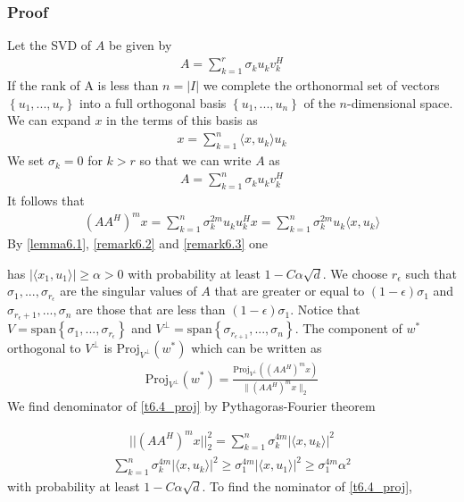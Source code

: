 \documentclass[a4paper, english, headtopline=0.08em, headsepline=0.04em, left = 1cm, right = 1cm, DIV=15]{article}
\begin{document}
\subsubsection*{Proof}
Let the SVD of $A$ be given by
\begin{align*}
	A = \sum_{k=1}^r \sigma_k u_k v_k^H
\end{align*}
If the rank of A is less than $n=|I|$ we complete the orthonormal set of vectors $\left\{u_1,...,u_r\right\}$
into a full orthogonal basis $\left\{u_1,...,u_n\right\}$ of the $n$-dimensional space.
We can expand $x$ in the terms of this basis as
\begin{align*}
	x = \sum_{k=1}^n \langle x,u_k\rangle u_k
\end{align*}
We set $\sigma_k=0$ for $k>r$ so that we can write $A$ as
\begin{align*}
	A = \sum_{k=1}^n \sigma_k u_k v_k^H
\end{align*}
It follows that 
\begin{align*}
	(AA^H)^m x = \sum_{k=1}^n \sigma_k^{2m}u_ku_k^Hx = \sum_{k=1}^n \sigma_k^{2m}u_k\langle x,u_k\rangle
\end{align*}
By \cref{lemma6.1}, \cref{remark6.2} and \cref{remark6.3} one 



has $|\langle x_1,u_1 \rangle| \geq  \alpha > 0$ with probability 
at least $1-C\alpha \sqrt{d}$.
We choose $r_{\epsilon}$ such that $\sigma_1,...,\sigma_{r_\epsilon}$ are the singular values of
$A$ that are greater or equal to $(1-\epsilon)\sigma_1$ and $\sigma_{r_{\epsilon}+1},...,\sigma_n$ are those 
that are less than $(1-\epsilon)\sigma_1$. Notice that $V = \text{span}\left\{\sigma_1,...,\sigma_{r_\epsilon}\right\}$ and
$V^\bot = \text{span}\left\{\sigma_{r_{\epsilon+1}},...,\sigma_{n}\right\}$.
The component of $w^*$ orthogonal to $V^\bot$ is $\text{Proj}_{V^{\bot }}(w^*)$ which can be written as
\begin{align}\label{t6.4_proj}
	\text{Proj}_{V^{\bot }}(w^*) = \frac{\text{Proj}_{V^{\bot}}\left( \left( AA^H\right)^m x \right)}{\|\left(AA^H\right)^m x\|_2}
\end{align}
We find  denominator of \cref{t6.4_proj} by Pythagoras-Fourier theorem

\begin{align} \label{t6.4_denom}
	||(AA^H)^m x||_2^2 = \sum_{k=1}^{n}\sigma_k^{4m} |\langle x,u_k\rangle|^2
\end{align}
\begin{align} \label{t6.4_denom_bound}
	\sum_{k=1}^{n}\sigma_k^{4m} |\langle x,u_k\rangle|^2 \geq
	\sigma_1^{4m}|\langle x,u_1\rangle|^2 \geq
	\sigma_1^{4m}\alpha^2 
\end{align}
with probability at least $1-C\alpha\sqrt{d}$. To find the nominator of \cref{t6.4_proj}, 
\end{document}
